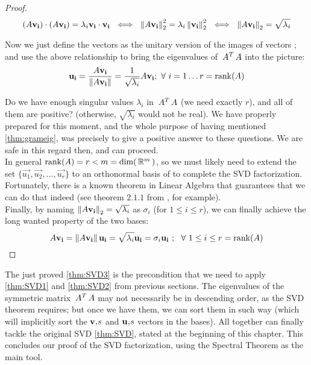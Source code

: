 \begin{proof}
\[
(A\mathbf{v_i}) \cdot (A\mathbf{v_i}) =  \lambda_i \mathbf{v_i} \cdot \mathbf{v_i}
\,\,\iff\,\, \left\lVert A\mathbf{v_i} \right\rVert_2^2 = \lambda_i \left\lVert \mathbf{v_i} \right\rVert_2^2
\,\,\iff\,\, \left\lVert A\mathbf{v_i} \right\rVert_2 = \sqrt{\lambda_i} 
\]
\hfill

Now we just define the vectors  as the unitary version
of the images of vectors ; and use the above
relationship to bring the eigenvalues of $\,{A}^{T}\,A$ into the
picture: \\

\[
\mathbf{u_i} = \dfrac{A\mathbf{v_i}}{\left\lVert A\mathbf{v_i} \right\rVert} =
\dfrac{1}{\sqrt{\lambda_i}} A\mathbf{v_i}; \,\,\forall\,\, i=1 \dots r = \operatorname{rank}(A)
\]
\hfill

Do we have enough singular values $\lambda_i$ in $\,{A}^{T}\,A$ (we
need exactly $r$), and all of them are positive? (otherwise,
$\sqrt{\lambda_i}$ would not be real). We have properly prepared for
this moment, and the whole purpose of having mentioned 
\cref{thm:grameig}, was precisely to give a positive answer to these
questions. We are safe in this regard then, and can proceed. \\

In general $\operatorname{rank}(A) = r < m = \operatorname{dim}(\,\mathbb{R}^{m}\,)$, so we must likely
need to extend the set $\{\vec{u_1},\vec{u_2},\dots,\vec{u_r}\}$ to an
orthonormal basis of  to complete the SVD
factorization. Fortunately, there is a 
known theorem in Linear Algebra that guarantees that we can do that
indeed (see theorem $2.1.1$ from \cite{golub13}, for example). \\

Finally, by naming $\left\lVert A\mathbf{v_i} \right\rVert_2 = \sqrt{\lambda_i}$ as $\sigma_i$
(for $1 \le i \le r$), we can finally achieve the long wanted property
of the two bases: \\

\[
A\mathbf{v_i} = \left\lVert A\mathbf{v_i} \right\rVert \mathbf{u_i} = 
\sqrt{\lambda_i} \mathbf{u_i} =
\sigma_i \mathbf{u_i} \,\,;\,\, \,\,\forall\,\, 1 \le i \le r = \operatorname{rank}(A)
\]
\end{proof}
\hfill

The just proved \cref{thm:SVD3} is the precondition that we
need to apply \cref{thm:SVD1} and \cref{thm:SVD2} from previous
sections. The eigenvalues of the symmetric matrix $\,{A}^{T}\,A$ may not
necessarily be in descending order, as the SVD theorem requires; but
once we have them, we can sort them in such way (which will implicitly
sort the $\vec{v}\apos{s}$ and $\vec{u}\apos{s}$ vectors in the
bases). All together can finally tackle the original SVD
\cref{thm:SVD}, stated at the beginning of this chapter. This
concludes our proof of the SVD factorization, using the Spectral
Theorem as the main tool. \\ 

